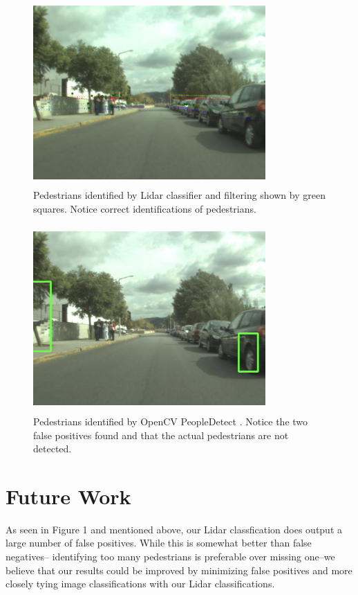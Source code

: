 \documentclass[10pt,twocolumn,letterpaper]{article}
\begin{document}
  \begin{figure}
    \includegraphics[height=2.8in, width=3.5in]{images/sample2lidar.png}
    \caption{ Pedestrians identified by Lidar classifier and filtering shown
    by green squares. Notice correct identifications of pedestrians. }
  \end{figure}

    \begin{figure}
    \includegraphics[height=2.8in, width=3.5in]{images/sample2cv.png}
    \caption{ Pedestrians identified by OpenCV PeopleDetect \cite{opencv}. 
    Notice the two false positives found and that the actual pedestrians are 
    not detected. }
  \end{figure}

\section{Future Work}
  As seen in Figure 1 and mentioned above, our Lidar classfication does output a
  large number of false positives. While this is somewhat better than false negatives--
  identifying too many pedestrians is preferable over missing one--we believe that
  our results could be improved by minimizing false positives and more closely
  tying image classifications with our Lidar classifications.
\end{document}
